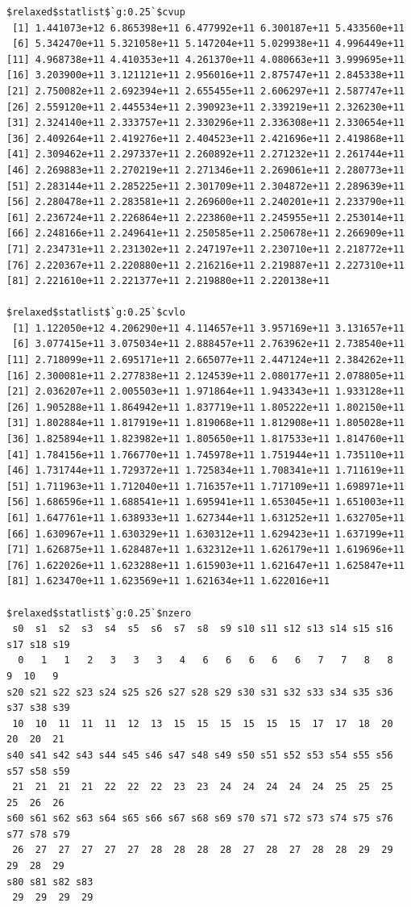\documentclass[
]{article}
\begin{document}
\begin{verbatim}
$relaxed$statlist$`g:0.25`$cvup
 [1] 1.441073e+12 6.865398e+11 6.477992e+11 6.300187e+11 5.433560e+11
 [6] 5.342470e+11 5.321058e+11 5.147204e+11 5.029938e+11 4.996449e+11
[11] 4.968738e+11 4.410353e+11 4.261370e+11 4.080663e+11 3.999695e+11
[16] 3.203900e+11 3.121121e+11 2.956016e+11 2.875747e+11 2.845338e+11
[21] 2.750082e+11 2.692394e+11 2.655455e+11 2.606297e+11 2.587747e+11
[26] 2.559120e+11 2.445534e+11 2.390923e+11 2.339219e+11 2.326230e+11
[31] 2.324140e+11 2.333757e+11 2.330296e+11 2.336308e+11 2.330654e+11
[36] 2.409264e+11 2.419276e+11 2.404523e+11 2.421696e+11 2.419868e+11
[41] 2.309462e+11 2.297337e+11 2.260892e+11 2.271232e+11 2.261744e+11
[46] 2.269883e+11 2.270219e+11 2.271346e+11 2.269061e+11 2.280773e+11
[51] 2.283144e+11 2.285225e+11 2.301709e+11 2.304872e+11 2.289639e+11
[56] 2.280478e+11 2.283581e+11 2.269600e+11 2.240201e+11 2.233790e+11
[61] 2.236724e+11 2.226864e+11 2.223860e+11 2.245955e+11 2.253014e+11
[66] 2.248166e+11 2.249641e+11 2.250585e+11 2.250678e+11 2.266909e+11
[71] 2.234731e+11 2.231302e+11 2.247197e+11 2.230710e+11 2.218772e+11
[76] 2.220367e+11 2.220880e+11 2.216216e+11 2.219887e+11 2.227310e+11
[81] 2.221610e+11 2.221377e+11 2.219880e+11 2.220138e+11

$relaxed$statlist$`g:0.25`$cvlo
 [1] 1.122050e+12 4.206290e+11 4.114657e+11 3.957169e+11 3.131657e+11
 [6] 3.077415e+11 3.075034e+11 2.888457e+11 2.763962e+11 2.738540e+11
[11] 2.718099e+11 2.695171e+11 2.665077e+11 2.447124e+11 2.384262e+11
[16] 2.300081e+11 2.277838e+11 2.124539e+11 2.080177e+11 2.078805e+11
[21] 2.036207e+11 2.005503e+11 1.971864e+11 1.943343e+11 1.933128e+11
[26] 1.905288e+11 1.864942e+11 1.837719e+11 1.805222e+11 1.802150e+11
[31] 1.802884e+11 1.817919e+11 1.819068e+11 1.812908e+11 1.805028e+11
[36] 1.825894e+11 1.823982e+11 1.805650e+11 1.817533e+11 1.814760e+11
[41] 1.784156e+11 1.766770e+11 1.745978e+11 1.751944e+11 1.735110e+11
[46] 1.731744e+11 1.729372e+11 1.725834e+11 1.708341e+11 1.711619e+11
[51] 1.711963e+11 1.712040e+11 1.716357e+11 1.717109e+11 1.698971e+11
[56] 1.686596e+11 1.688541e+11 1.695941e+11 1.653045e+11 1.651003e+11
[61] 1.647761e+11 1.638933e+11 1.627344e+11 1.631252e+11 1.632705e+11
[66] 1.630967e+11 1.630329e+11 1.630312e+11 1.629423e+11 1.637199e+11
[71] 1.626875e+11 1.628487e+11 1.632312e+11 1.626179e+11 1.619696e+11
[76] 1.622026e+11 1.623288e+11 1.615903e+11 1.621647e+11 1.625847e+11
[81] 1.623470e+11 1.623569e+11 1.621634e+11 1.622016e+11

$relaxed$statlist$`g:0.25`$nzero
 s0  s1  s2  s3  s4  s5  s6  s7  s8  s9 s10 s11 s12 s13 s14 s15 s16 s17 s18 s19 
  0   1   1   2   3   3   3   4   6   6   6   6   6   7   7   8   8   9  10   9 
s20 s21 s22 s23 s24 s25 s26 s27 s28 s29 s30 s31 s32 s33 s34 s35 s36 s37 s38 s39 
 10  10  11  11  11  12  13  15  15  15  15  15  15  17  17  18  20  20  20  21 
s40 s41 s42 s43 s44 s45 s46 s47 s48 s49 s50 s51 s52 s53 s54 s55 s56 s57 s58 s59 
 21  21  21  21  22  22  22  23  23  24  24  24  24  24  25  25  25  25  26  26 
s60 s61 s62 s63 s64 s65 s66 s67 s68 s69 s70 s71 s72 s73 s74 s75 s76 s77 s78 s79 
 26  27  27  27  27  27  28  28  28  28  27  28  27  28  28  29  29  29  28  29 
s80 s81 s82 s83 
 29  29  29  29 



\end{verbatim}
\end{document}
